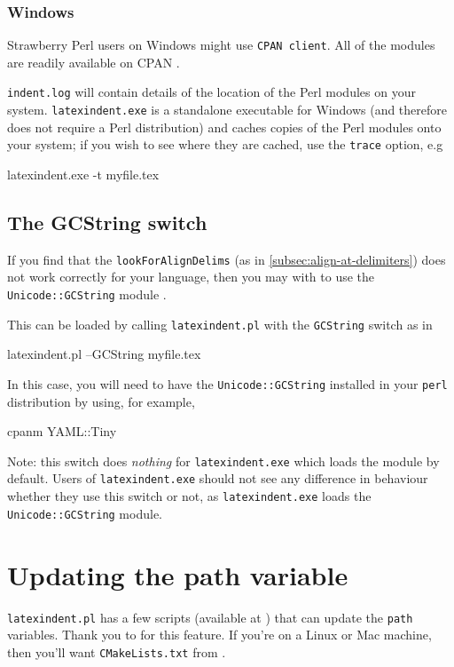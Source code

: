  \subsubsection{Windows}
  Strawberry Perl users on Windows might use \texttt{CPAN client}. All of the modules are
  readily available on CPAN \cite{cpan}.

  \texttt{indent.log} will contain details of the location
  of the Perl modules on your system. \texttt{latexindent.exe} is a standalone executable
  for Windows (and therefore does not require a Perl distribution) and caches copies of the
  Perl modules onto your system; if you wish to see where they are cached, use the
  \texttt{trace} option, e.g
  \begin{dosprompt}
latexindent.exe -t myfile.tex
 \end{dosprompt}

 \subsection{The GCString switch}\label{subsec:the-GCString}
  If you find that the \texttt{lookForAlignDelims} (as in \cref{subsec:align-at-delimiters}) does not work correctly
  for your language, then you may with to use the \texttt{Unicode::GCString} module .

  This can be loaded by calling \texttt{latexindent.pl} with the \texttt{GCString} switch
  as in
  \begin{commandshell}
latexindent.pl --GCString myfile.tex
\end{commandshell}
  In this case, you will need to have the \texttt{Unicode::GCString} installed in your
  \texttt{perl} distribution by using, for example,
  \begin{commandshell}
cpanm YAML::Tiny
\end{commandshell}

  Note: this switch does \emph{nothing} for \texttt{latexindent.exe} which loads the module
  by default. Users of \texttt{latexindent.exe} should not see any difference in behaviour
  whether they use this switch or not, as \texttt{latexindent.exe} loads the
  \texttt{Unicode::GCString} module.

 \section{Updating the path variable}\label{sec:updating-path}
  \texttt{latexindent.pl} has a few scripts (available at \cite{latexindent-home}) that can
  update the \texttt{path} variables. Thank you to \cite{jasjuang} for this feature. If
  you're on a Linux or Mac machine, then you'll want \texttt{CMakeLists.txt} from
  \cite{latexindent-home}.
